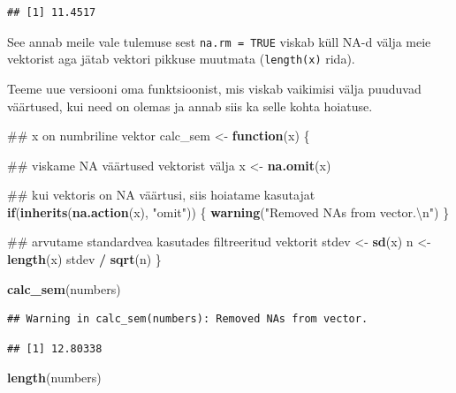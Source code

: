 \documentclass[]{book}
\newenvironment{Shaded}{\begin{snugshade}}{\end{snugshade}}
\newcommand{\KeywordTok}[1]{\textcolor[rgb]{0.13,0.29,0.53}{\textbf{#1}}}
\newcommand{\CharTok}[1]{\textcolor[rgb]{0.31,0.60,0.02}{#1}}
\newcommand{\StringTok}[1]{\textcolor[rgb]{0.31,0.60,0.02}{#1}}
\newcommand{\ControlFlowTok}[1]{\textcolor[rgb]{0.13,0.29,0.53}{\textbf{#1}}}
\newcommand{\OperatorTok}[1]{\textcolor[rgb]{0.81,0.36,0.00}{\textbf{#1}}}
\newcommand{\NormalTok}[1]{#1}
\begin{document}
\begin{verbatim}
## [1] 11.4517
\end{verbatim}

See annab meile vale tulemuse sest \texttt{na.rm\ =\ TRUE} viskab küll
NA-d välja meie vektorist aga jätab vektori pikkuse muutmata
(\texttt{length(x)} rida).

Teeme uue versiooni oma funktsioonist, mis viskab vaikimisi välja
puuduvad väärtused, kui need on olemas ja annab siis ka selle kohta
hoiatuse.

\begin{Shaded}
\begin{Highlighting}[]
\NormalTok{## x on numbriline vektor}
\NormalTok{calc_sem <-}\StringTok{ }\ControlFlowTok{function}\NormalTok{(x) \{}
  
\NormalTok{  ## viskame NA väärtused vektorist välja}
\NormalTok{  x <-}\StringTok{ }\KeywordTok{na.omit}\NormalTok{(x)}
  
\NormalTok{  ## kui vektoris on NA väärtusi, siis hoiatame kasutajat}
  \ControlFlowTok{if}\NormalTok{(}\KeywordTok{inherits}\NormalTok{(}\KeywordTok{na.action}\NormalTok{(x), }\StringTok{"omit"}\NormalTok{)) \{}
    \KeywordTok{warning}\NormalTok{(}\StringTok{"Removed NAs from vector.}\CharTok{\textbackslash{}n}\StringTok{"}\NormalTok{)}
\NormalTok{  \}}
  
\NormalTok{  ## arvutame standardvea kasutades filtreeritud vektorit}
\NormalTok{  stdev <-}\StringTok{ }\KeywordTok{sd}\NormalTok{(x)}
\NormalTok{  n <-}\StringTok{ }\KeywordTok{length}\NormalTok{(x)}
\NormalTok{  stdev }\OperatorTok{/}\StringTok{ }\KeywordTok{sqrt}\NormalTok{(n)}
\NormalTok{\}}

\KeywordTok{calc_sem}\NormalTok{(numbers)}
\end{Highlighting}
\end{Shaded}

\begin{verbatim}
## Warning in calc_sem(numbers): Removed NAs from vector.
\end{verbatim}

\begin{verbatim}
## [1] 12.80338
\end{verbatim}

\begin{Shaded}
\begin{Highlighting}[]
\KeywordTok{length}\NormalTok{(numbers)}
\end{Highlighting}
\end{Shaded}
\end{document}
